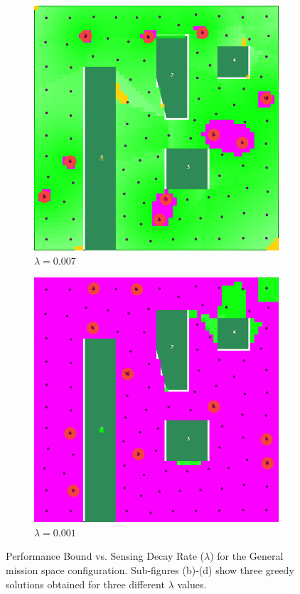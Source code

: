 \documentclass[conference]{IEEEtran}
\begin{document}
\begin{figure}[!b]
\begin{subfigure}[t]{0.105\textwidth}
        \includegraphics[width=\textwidth]{Figures/Gen2_2.png}
        \caption{$\lambda=0.007$}
    \end{subfigure}\hspace{3mm}
    \begin{subfigure}[t]{0.105\textwidth}
        \centering
        \includegraphics[width=\textwidth]{Figures/Gen2_3.png}
        \caption{$\lambda=0.001$}
    \end{subfigure}
    \caption{Performance Bound vs. Sensing Decay Rate ($\lambda$) for the General mission space configuration. Sub-figures (b)-(d) show three greedy solutions obtained for three different $\lambda$ values.}
    \label{Fig:GeneralConfigBetaVsDecay}
\end{figure}
\end{document}
